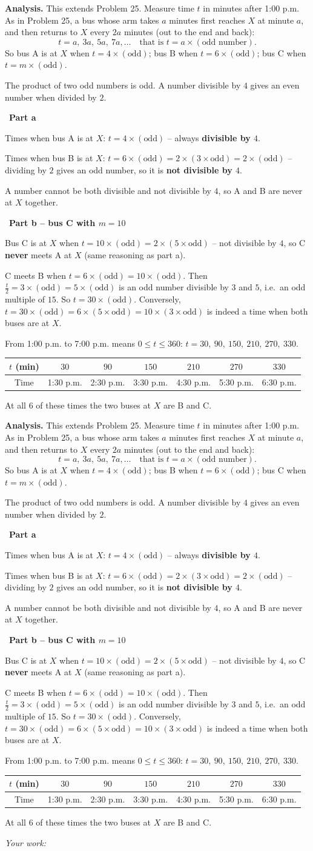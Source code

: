\documentclass[11pt]{article}
\newif\ifsol \soltrue
\newcommand{\StuProb}[2]{\begin{probboxS}{#1}{#2}\StuProbBody\end{probboxS}}
\newcommand{\probsol}[1]{%
  \begin{lrbox}{\solmeasure}\begin{minipage}{\dimexpr\linewidth-24pt\relax}#1\end{minipage}\end{lrbox}%
  \ifsol
    \begin{solbox}#1\end{solbox}%
  \else
    \setlength{\solht}{\dimexpr\ht\solmeasure+\dp\solmeasure+0.85cm\relax}%
    \ifdim\solht<1.35cm\setlength{\solht}{1.35cm}\fi
    \ifdim\solht>\StudentMaxWork\setlength{\solht}{\StudentMaxWork}\fi
    \par\noindent\begin{minipage}{\linewidth}%
    \expandafter\StuProb\StuProbArgs
    \begin{tcolorbox}[colback=white,colframe=Line,boxrule=0.8pt,arc=5pt,
      left=8pt,right=8pt,top=4pt,bottom=4pt,height=\solht]{\footnotesize\color{Slate}\itshape\WorkWord}\end{tcolorbox}%
    \end{minipage}\par\medskip
  \fi}
\newlength{\StudentMaxWork}\setlength{\StudentMaxWork}{4.5cm}
\newcommand{\step}[2]{\par\smallskip\noindent{\bfseries\color{tmBlue!85!black}\StepWord~#1.}\ {\bfseries #2}\par\nopagebreak}
\def\WorkWord{Your work:}
\def\StepWord{Step}
\begin{document}
\probsol{
\textbf{Analysis.} This extends Problem 25. Measure time $t$ in minutes after 1:00 p.m. As in Problem 25, a bus whose arm takes $a$ minutes first reaches $X$ at minute $a$, and then returns to $X$ every $2a$ minutes (out to the end and back):
\[ t=a,\ 3a,\ 5a,\ 7a,\dots \quad\text{that is } t=a\times(\text{odd number}). \]
So bus A is at $X$ when $t=4\times(\text{odd})$; bus B when $t=6\times(\text{odd})$; bus C when $t=m\times(\text{odd})$.
\begin{recallbox}The product of two odd numbers is odd. A number divisible by $4$ gives an even number when divided by $2$.\end{recallbox}

\step{1}{Part a}
Times when bus A is at $X$: $t=4\times(\text{odd})$ -- always \textbf{divisible by $4$}.\par
Times when bus B is at $X$: $t=6\times(\text{odd})=2\times(3\times\text{odd})=2\times(\text{odd})$ -- dividing by $2$ gives an odd number, so it is \textbf{not divisible by $4$}.\par
A number cannot be both divisible and not divisible by $4$, so A and B are never at $X$ together.

\step{2}{Part b -- bus C with $m=10$}
Bus C is at $X$ when $t=10\times(\text{odd})=2\times(5\times\text{odd})$ -- not divisible by $4$, so C \textbf{never} meets A at $X$ (same reasoning as part a).\par
C meets B when $t=6\times(\text{odd})=10\times(\text{odd})$. Then $\frac{t}{2}=3\times(\text{odd})=5\times(\text{odd})$ is an odd number divisible by $3$ and $5$, i.e.\ an odd multiple of $15$. So $t=30\times(\text{odd})$. Conversely, $t=30\times(\text{odd})=6\times(5\times\text{odd})=10\times(3\times\text{odd})$ is indeed a time when both buses are at $X$.\par
From 1:00 p.m. to 7:00 p.m. means $0\le t\le 360$: $t=30,\ 90,\ 150,\ 210,\ 270,\ 330$.
\begin{center}
\begin{tabular}{|c|c|c|c|c|c|c|}
\hline
\rowcolor{tmBlue!10}$t$ (min) & $30$ & $90$ & $150$ & $210$ & $270$ & $330$\\ \hline
Time & 1:30 p.m. & 2:30 p.m. & 3:30 p.m. & 4:30 p.m. & 5:30 p.m. & 6:30 p.m.\\ \hline
\end{tabular}
\end{center}
At all $6$ of these times the two buses at $X$ are B and C.

}
\end{document}
